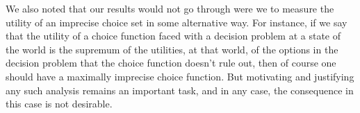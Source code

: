 \documentclass[a4paper,final]{article}
\newcommand\U{\mathfrak{U}} %
\newcommand{\todoold}[2][]{\todo[backgroundcolor=white,bordercolor=orange!10,linecolor=gray!10, #1,caption={},textcolor=gray]{Pre-rev: #2}}
\newcommand{\todooldinfo}[2][]{\todoold[#1]{#2}}
\renewcommand{\color}[1]{}
\newcommand\SetDelimiter[1][]{
	\nonscript\,#1\vert \allowbreak \nonscript\,\mathopen{}}
\providecommand\given{\SetDelimiter}
\newenvironment{CCM rewritten}
{\begingroup\color{blue}} %
{\endgroup}              %
\begin{document}
We also noted that our results would not go through were we to measure the utility of an imprecise choice set in some alternative way. For instance, if we say that the utility of a choice function faced with a decision problem at a state of the world is the supremum of the utilities, at that world, of the options in the decision problem that the choice function doesn't rule out, then of course one should have a maximally imprecise choice function. But motivating and justifying any such analysis remains an important task, and in any case, the consequence in this case is not desirable.
%
%
\end{document}
